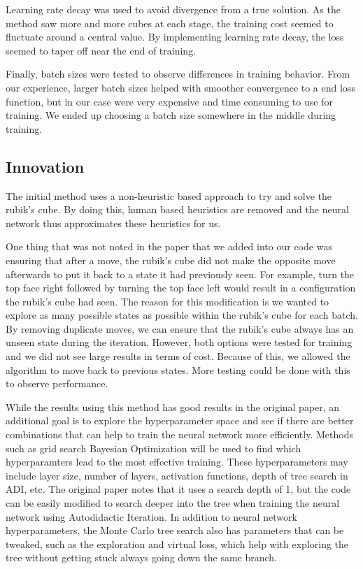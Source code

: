 \documentclass[10pt,twocolumn,letterpaper]{article}
\begin{document}
Learning rate decay was used to avoid divergence from a true solution. As the method saw more and more cubes at each stage, the training cost seemed to fluctuate around a central value. By implementing learning rate decay, the loss seemed to taper off near the end of training.

Finally, batch sizes were tested to observe differences in training behavior. From our experience, larger batch sizes helped with smoother convergence to a end loss function, but in our case were very expensive and time consuming to use for training. We ended up choosing a batch size somewhere in the middle during training.

\subsection{Innovation}
The initial method uses a non-heuristic based approach to try and solve the rubik's cube. By doing this, human based heuristics are removed and the neural network thus approximates these heuristics for us. 

One thing that was not noted in the paper that we added into our code was ensuring that after a move, the rubik's cube did not make the opposite move afterwards to put it back to a state it had previously seen. For example, turn the top face right followed by turning the top face left would result in a configuration the rubik's cube had seen. The reason for this modification is we wanted to explore as many possible states as possible within the rubik's cube for each batch. By removing duplicate moves, we can ensure that the rubik's cube always has an unseen state during the iteration. However, both options were tested for training and we did not see large results in terms of cost. Because of this, we allowed the algorithm to move back to previous states. More testing could be done with this to observe performance.

While the results using this method has good results in the original paper, an additional goal is to explore the hyperparameter space  and see if there are better combinations that can help to train the neural network more efficiently. Methods such as grid search Bayesian Optimization  will be used to find which hyperparamters lead to the most effective training. These hyperparameters may include layer size, number of layers, activation functions, depth of tree search in ADI, etc. The original paper notes that it uses a search depth of 1, but the code can be easily modified to search deeper into the tree when training the neural network using Autodidactic Iteration. In addition to neural network hyperparameters, the Monte Carlo tree search also has parameters that can be tweaked, such as the exploration and virtual loss, which help with exploring the tree without getting stuck always going down the same branch.
\end{document}
